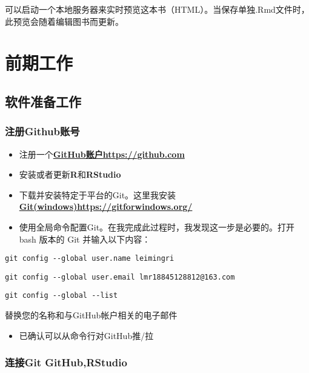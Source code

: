 \documentclass[
]{book}
\providecommand{\tightlist}{%
  \setlength{\itemsep}{0pt}\setlength{\parskip}{0pt}}
\begin{document}
可以启动一个本地服务器来实时预览这本书（HTML）。当保存单独.Rmd文件时，此预览会随着编辑图书而更新。

\hypertarget{ux524dux671fux5de5ux4f5c}{%
\chapter{前期工作}\label{ux524dux671fux5de5ux4f5c}}

\hypertarget{ux8f6fux4ef6ux51c6ux5907ux5de5ux4f5c}{%
\section{软件准备工作}\label{ux8f6fux4ef6ux51c6ux5907ux5de5ux4f5c}}

\hypertarget{ux6ce8ux518cgithubux8d26ux53f7}{%
\subsection{注册Github账号}\label{ux6ce8ux518cgithubux8d26ux53f7}}

\begin{itemize}
\item
  注册一个\href{https://github.com}{\textbf{GitHub账户https://github.com}}
\item
  安装或者更新\textbf{R}和\textbf{RStudio}
\item
  下载并安装特定于平台的Git。这里我安装\href{https://gitforwindows.org/}{\textbf{Git(windows)https://gitforwindows.org/}}
\item
  使用全局命令配置Git。在我完成此过程时，我发现这一步是必要的。打开 bash 版本的 Git 并输入以下内容：
\end{itemize}

\texttt{git\ config\ -\/-global\ user.name\ \textquotesingle{}leimingri\textquotesingle{}}

\texttt{git\ config\ -\/-global\ user.email\ \textquotesingle{}lmr18845128812@163.com\textquotesingle{}}

\texttt{git\ config\ -\/-global\ -\/-list}

替换您的名称和与GitHub帐户相关的电子邮件

\begin{itemize}
\tightlist
\item
  已确认可以从命令行对GitHub推/拉
\end{itemize}

\hypertarget{ux8fdeux63a5git-githubrstudio}{%
\subsection{连接Git GitHub,RStudio}\label{ux8fdeux63a5git-githubrstudio}}
\end{document}
